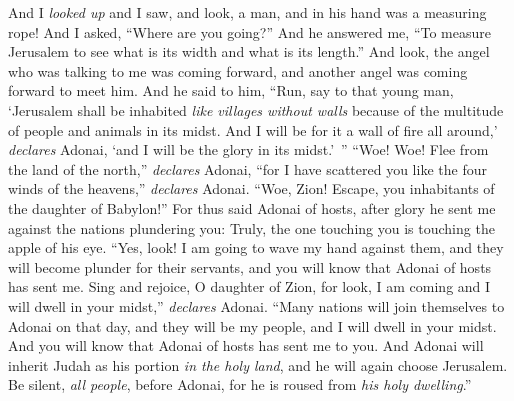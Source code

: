 \begin{biblechapter} %
 And I \textit{looked up} and I saw, and look, a man, and in his hand was a measuring rope!
\verse And I asked, “Where are you going?” And he answered me, “To measure Jerusalem to see what is its width and what is its length.”
\verse And look, the angel who was talking to me was coming forward, and another angel was coming forward to meet him.
\verse And he said to him, “Run, say to that young man, ‘Jerusalem shall be inhabited \textit{like villages without walls} because of the multitude of people and animals in its midst.
\verse And I will be for it a wall of fire all around,’ \textit{declares} Adonai, ‘and I will be the glory in its midst.’ ”
\verse “Woe! Woe! Flee from the land of the north,” \textit{declares} Adonai, “for I have scattered you like the four winds of the heavens,” \textit{declares} Adonai.
\verse “Woe, Zion! Escape, you inhabitants of the daughter of Babylon!”
\verse For thus said Adonai of hosts, after glory he sent me against the nations plundering you: Truly, the one touching you is touching the apple of his eye.
\verse “Yes, look! I am going to wave my hand against them, and they will become plunder for their servants, and you will know that Adonai of hosts has sent me.
\verse Sing and rejoice, O daughter of Zion, for look, I am coming and I will dwell in your midst,” \textit{declares} Adonai.
\verse “Many nations will join themselves to Adonai on that day, and they will be my people, and I will dwell in your midst. And you will know that Adonai of hosts has sent me to you.
\verse And Adonai will inherit Judah as his portion \textit{in the holy land}, and he will again choose Jerusalem.
\verse Be silent, \textit{all people}, before Adonai, for he is roused from \textit{his holy dwelling}.”
\end{biblechapter}

